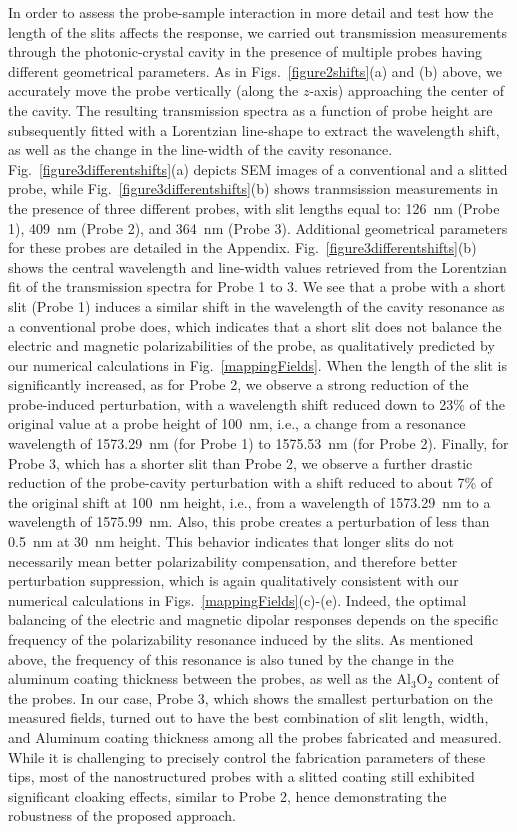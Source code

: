 \documentclass{osa-article}
\begin{document}
	In order to assess the probe-sample interaction in more detail and test how the length of the slits affects the response, we carried out transmission measurements through the photonic-crystal cavity in the presence of multiple probes having different geometrical parameters. As in Figs.~\ref{figure2shifts}(a) and (b) above, we accurately move the probe vertically (along the $z$-axis) approaching the center of the cavity. The resulting transmission spectra as a function of probe height are subsequently fitted with a Lorentzian line-shape to extract the wavelength shift, as well as the change in the line-width of the cavity resonance. Fig.~\ref{figure3differentshifts}(a) depicts SEM images of a conventional and a slitted probe, while Fig.~\ref{figure3differentshifts}(b) shows tranmsission measurements in the presence of three different probes, with slit lengths equal to: 126~nm (Probe 1), 409~nm (Probe 2), and 364~nm (Probe 3). Additional geometrical parameters for these probes are detailed in the Appendix.
	Fig.~\ref{figure3differentshifts}(b) shows the central wavelength and line-width values retrieved from the Lorentzian fit of the transmission spectra for Probe 1 to 3. We see that a probe with a short slit (Probe 1) induces a similar shift in the wavelength of the cavity resonance as a conventional probe does, which indicates that a short slit does not balance the electric and magnetic polarizabilities of the probe, as qualitatively predicted by our numerical calculations in Fig.~\ref{mappingFields}. When the length of the slit is significantly increased, as for Probe 2, we observe a strong reduction of the probe-induced perturbation, with a wavelength shift reduced down to 23\% of the original value at a probe height of 100~nm, i.e., a change from a resonance wavelength of 1573.29~nm (for Probe 1) to 1575.53~nm (for Probe 2). Finally, for Probe 3, which has a shorter slit than Probe 2, we observe a further drastic reduction of the probe-cavity perturbation with a shift reduced to about 7\% of the original shift at 100~nm height, i.e., from a wavelength of 1573.29~nm to a wavelength of 1575.99~nm. Also, this probe creates a perturbation of less than 0.5~nm at 30~nm height. This behavior indicates that longer slits do not necessarily mean better polarizability compensation, and therefore better perturbation suppression, which is again qualitatively consistent with our numerical calculations in Figs.~\ref{mappingFields}(c)-(e). 
	Indeed, the optimal balancing of the electric and magnetic dipolar responses depends on the specific frequency of the polarizability resonance induced by the slits. As mentioned above, the frequency of this resonance is also tuned by the change in the aluminum coating thickness between the probes, as well as the Al$_{3}$O$_{2}$ content of the probes. In our case, Probe 3, which shows the smallest perturbation on the measured fields, turned out to have the best combination of slit length, width, and Aluminum coating thickness among all the probes fabricated and measured. While it is challenging to precisely control the fabrication parameters of these tips, most of the nanostructured probes with a slitted coating still exhibited significant cloaking effects, similar to Probe 2, hence demonstrating the robustness of the proposed approach.\par
\end{document}
